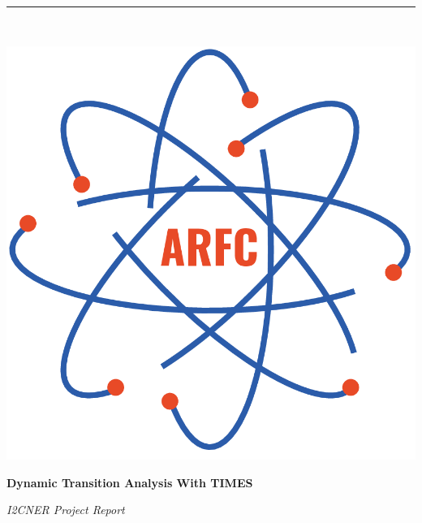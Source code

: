 \documentclass[14pt,a4paper]{article} %
\begin{document}

\begin{titlepage} %
    \newcommand{\HRule}{\rule{\linewidth}{0.5mm}} %
    
    \center %

    
    \HRule\\[0.2cm]
    
     \begin{minipage}{0.4\textwidth}
        \includegraphics[width=\textwidth]{arfc-logo}
        \end{minipage}%
        \begin{minipage}{0.6\textwidth}
        {\begin{flushright}\huge\bfseries Dynamic Transition Analysis With \gls{TIMES} \end{flushright}}
        {\begin{flushright}\large\textit{\gls{I2CNER} Project Report}\end{flushright}}


\end{minipage}
\end{titlepage}
\end{document}
